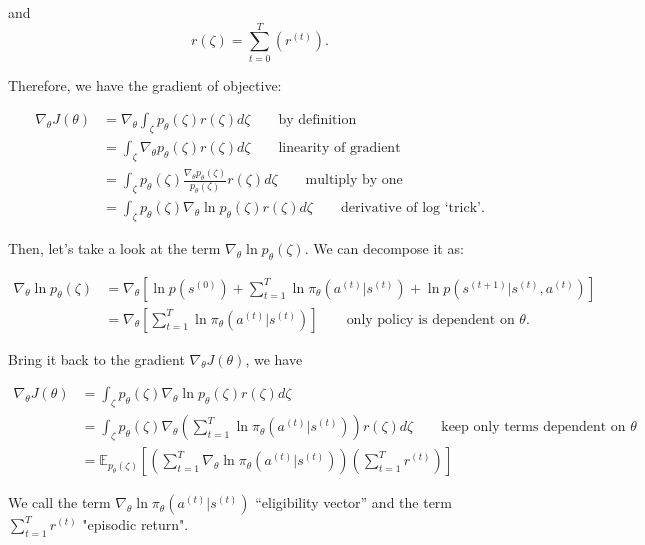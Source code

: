 \documentclass[11pt]{article}
\begin{document}
and
$$r(\zeta) = \sum_{t=0}^{T}(r^{(t)}).$$

Therefore, we have the gradient of objective:

\begin{equation*}
\begin{split}
\nabla_{\theta} J(\theta) & = \nabla_{\theta} \int_\zeta p_\theta(\zeta)r(\zeta)d\zeta \qquad \text{by definition}\\
& = \int_\zeta \nabla_{\theta}p_\theta(\zeta)r(\zeta)d\zeta \qquad \text{linearity of gradient}\\
& = \int_\zeta p_\theta(\zeta) \frac{\nabla_{\theta}p_\theta(\zeta)}{p_\theta(\zeta)}r(\zeta)d\zeta \qquad \text{multiply by one}\\
& = \int_\zeta p_\theta(\zeta)\nabla_\theta \ln p_\theta(\zeta)r(\zeta)d\zeta \qquad \text{derivative of log ‘trick'.}
\end{split}
\end{equation*}

Then, let's take a look at the term $\nabla_\theta \ln p_\theta(\zeta)$. We can decompose it as:

\begin{equation*}
\begin{split}
\nabla_\theta \ln p_\theta(\zeta) &= \nabla_\theta [\ln p(s^{(0)}) + \sum_{t=1}^T \ln \pi_\theta(a^{(t)}|s^{(t)}) + \ln p(s^{(t+1)}|s^{(t)},a^{(t)})]\\
& = \nabla_\theta [\sum_{t=1}^T \ln \pi_\theta(a^{(t)}|s^{(t)})] \qquad \text{only policy is dependent on $\theta$.}
\end{split}
\end{equation*}

Bring it back to the gradient $\nabla_\theta J(\theta)$, we have 

\begin{equation}
\begin{split}
\nabla_{\theta} J(\theta) & = \int_\zeta p_\theta(\zeta)\nabla_\theta \ln p_\theta(\zeta)r(\zeta)d\zeta\\
& = \int_\zeta p_\theta(\zeta)\nabla_\theta(\sum_{t=1}^T \ln \pi_\theta(a^{(t)}|s^{(t)}))r(\zeta)d\zeta \qquad \text{keep only terms dependent on $\theta$} \\
& = \mathbb{E}_{p_\theta(\zeta)}[(\sum_{t=1}^T \nabla_\theta \ln \pi_\theta(a^{(t)}|s^{(t)})) (\sum_{t=1}^T r^{(t)})]
\end{split}
\label{equ:gradient}
\end{equation}
 
We call the term $\nabla_\theta \ln \pi_\theta(a^{(t)}|s^{(t)})$ “eligibility vector” and the term $\sum_{t=1}^T r^{(t)}$ "episodic return". \\
\end{document}
